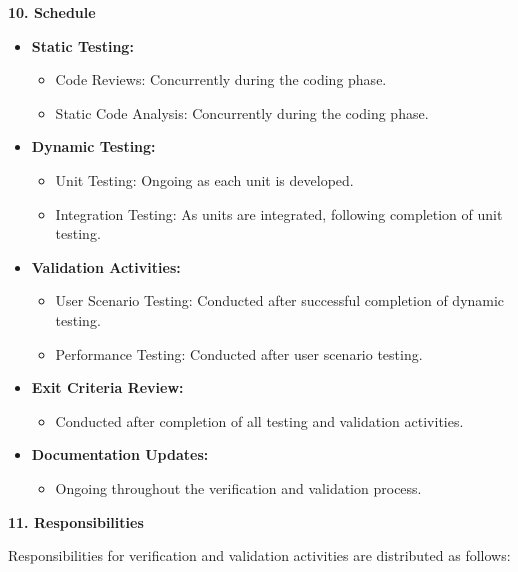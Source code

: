 \documentclass[
]{article}
\begin{document}
\textbf{10. Schedule}

\begin{itemize}
\item
  \textbf{Static Testing:}

  \begin{itemize}
  \item
    Code Reviews: Concurrently during the coding phase.
  \item
    Static Code Analysis: Concurrently during the coding phase.
  \end{itemize}
\item
  \textbf{Dynamic Testing:}

  \begin{itemize}
  \item
    Unit Testing: Ongoing as each unit is developed.
  \item
    Integration Testing: As units are integrated, following completion
    of unit testing.
  \end{itemize}
\item
  \textbf{Validation Activities:}

  \begin{itemize}
  \item
    User Scenario Testing: Conducted after successful completion of
    dynamic testing.
  \item
    Performance Testing: Conducted after user scenario testing.
  \end{itemize}
\item
  \textbf{Exit Criteria Review:}

  \begin{itemize}
  \item
    Conducted after completion of all testing and validation activities.
  \end{itemize}
\item
  \textbf{Documentation Updates:}

  \begin{itemize}
  \item
    Ongoing throughout the verification and validation process.
  \end{itemize}
\end{itemize}

\textbf{11. Responsibilities}

Responsibilities for verification and validation activities are
distributed as follows:
\end{document}
